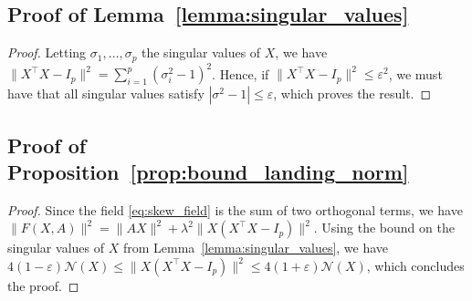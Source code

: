 \documentclass[twoside,11pt]{article}
\begin{document}
\subsection{Proof of Lemma~\ref{lemma:singular_values}}
\begin{proof}
Letting $\sigma_1,\dots, \sigma_p$ the singular values of $X$, we have $\|X^{\top}X-I_p\|^2 = \sum_{i=1}^p(\sigma_i^2 - 1)^2$. Hence, if $\|X^{\top}X-I_p\|^2\leq \varepsilon^2$, we must have that all singular values satisfy $|\sigma^2 - 1| \leq \varepsilon$, which proves the result.    
\end{proof}


\subsection{Proof of Proposition~\ref{prop:bound_landing_norm}}
\begin{proof}
  Since the field \eqref{eq:skew_field} is the sum of two orthogonal terms, we have
  $\|F(X, A)\|^2 = \|AX\|^2 + \lambda^2\|X(X^\top X - I_p)\|^2$.
  Using the bound on the singular values of $X$ from Lemma~\ref{lemma:singular_values}, we have $4(1-\varepsilon) \mathcal{N}(X)\leq \|X(X^\top X - I_p)\|^2\leq 4(1+\varepsilon) \mathcal{N}(X)$, 
  which concludes the proof.
\end{proof}
\end{document}
